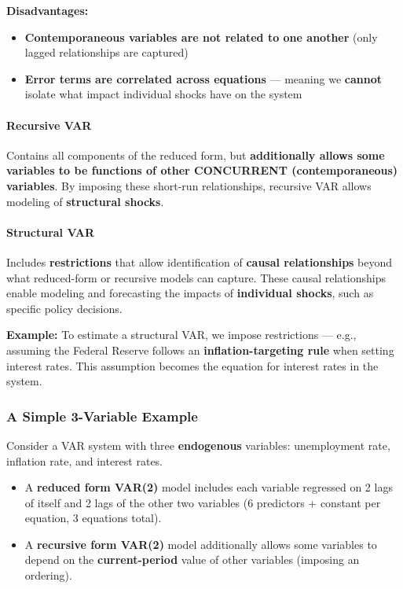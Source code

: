 \documentclass[12pt,openany]{book}
\begin{document}
\textbf{Disadvantages:}
\begin{itemize}[leftmargin=*]
    \item \textbf{Contemporaneous variables are not related to one another} (only lagged relationships are captured)
    \item \textbf{Error terms are correlated across equations} --- meaning we \textbf{cannot} isolate what impact individual shocks have on the system
\end{itemize}

\paragraph{Recursive VAR}

Contains all components of the reduced form, but \textbf{additionally allows some variables to be functions of other CONCURRENT (contemporaneous) variables}. By imposing these short-run relationships, recursive VAR allows modeling of \textbf{structural shocks}.

\paragraph{Structural VAR}

Includes \textbf{restrictions} that allow identification of \textbf{causal relationships} beyond what reduced-form or recursive models can capture. These causal relationships enable modeling and forecasting the impacts of \textbf{individual shocks}, such as specific policy decisions.

\textbf{Example:} To estimate a structural VAR, we impose restrictions --- e.g., assuming the Federal Reserve follows an \textbf{inflation-targeting rule} when setting interest rates. This assumption becomes the equation for interest rates in the system.

\subsubsection{A Simple 3-Variable Example}

Consider a VAR system with three \textbf{endogenous} variables: unemployment rate, inflation rate, and interest rates.

\begin{itemize}[leftmargin=*]
    \item A \textbf{reduced form VAR(2)} model includes each variable regressed on 2 lags of itself and 2 lags of the other two variables (6 predictors + constant per equation, 3 equations total).
    \item A \textbf{recursive form VAR(2)} model additionally allows some variables to depend on the \textbf{current-period} value of other variables (imposing an ordering).
\end{itemize}
\end{document}

